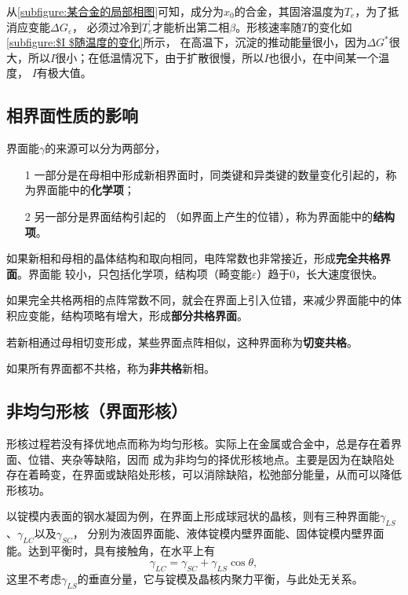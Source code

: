             从\autoref{subfigure:某合金的局部相图}可知，成分为$x_0$的合金，其固溶温度为$T_e$，为了抵消应变能$\Delta G_\varepsilon$，
            必须过冷到$T_e^{\prime}$才能析出第二相$\beta$。形核速率随$T$的变化如\autoref{subfigure:$I $随温度的变化}所示，
            在高温下，沉淀的推动能量很小，因为$\Delta G^*$很大，所以$I$很小；在低温情况下，由于扩散很慢，所以$I$也很小，在中间某一个温度，
            $I$有极大值。

        \subsection{相界面性质的影响}

            界面能$\gamma$的来源可以分为两部分，
            \begin{itemize}
                \item[1] 一部分是在母相中形成新相界面时，同类键和异类键的数量变化引起的，称为界面能中的\textbf{化学项}；
                \item[2] 另一部分是界面结构引起的 （如界面上产生的位错），称为界面能中的\textbf{结构项}。
            \end{itemize}
            
            如果新相和母相的晶体结构和取向相同，电阵常数也非常接近，形成\textbf{完全共格界面}。界面能
            较小，只包括化学项，结构项（畸变能$\varepsilon$）趋于0，长大速度很快。

            如果完全共格两相的点阵常数不同，就会在界面上引入位错，来减少界面能中的体积应变能，结构项略有增大，形成\textbf{部分共格界面}。

            若新相通过母相切变形成，某些界面点阵相似，这种界面称为\textbf{切变共格}。

            如果所有界面都不共格，称为\textbf{非共格}新相。

            
        \subsection{非均匀形核（界面形核）}
            形核过程若没有择优地点而称为均匀形核。实际上在金属或合金中，总是存在着界面、位错、夹杂等缺陷，因而
            成为非均匀的择优形核地点。主要是因为在缺陷处存在着畸变，在界面或缺陷处形核，可以消除缺陷，松弛部分能量，从而可以降低形核功。

            以锭模内表面的钢水凝固为例，在界面上形成球冠状的晶核，则有三种界面能$\gamma_{LS}$、$\gamma_{LC}$以及$\gamma_{SC}$，
            分别为液固界面能、液体锭模内壁界面能、固体锭模内壁界面能。达到平衡时，具有接触角，在水平上有
            \begin{equation}
                \gamma_{LC}=\gamma_{SC}+\gamma_{LS}\cos\theta\label{晶核形核过程中的力学平衡},
            \end{equation}
            这里不考虑$\gamma_{LS}$的垂直分量，它与锭模及晶核内聚力平衡，与此处无关系。

